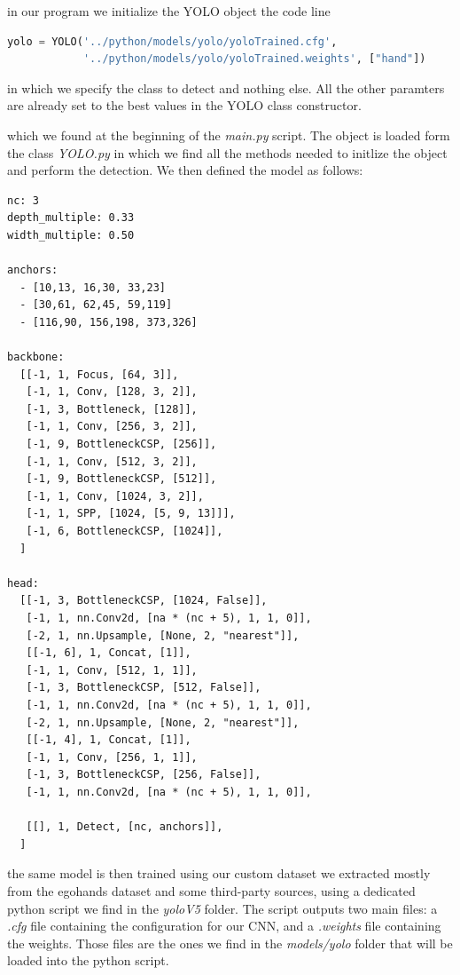 in our program we initialize the YOLO object the code line

\begin{lstlisting}[language=python]
    yolo = YOLO('../python/models/yolo/yoloTrained.cfg',
            '../python/models/yolo/yoloTrained.weights', ["hand"])
\end{lstlisting}
in which we specify the class to detect and nothing else. All the other
paramters are already set to the best values in the
YOLO class constructor.

which we found at the beginning of the \textit{main.py} script. The object is
loaded form the class \textit{YOLO.py}
in which we find all the methods needed to initlize the object and perform the
detection. We then defined the model as follows:

\begin{lstlisting}[]
nc: 3
depth_multiple: 0.33
width_multiple: 0.50

anchors:
  - [10,13, 16,30, 33,23] 
  - [30,61, 62,45, 59,119]
  - [116,90, 156,198, 373,326] 

backbone:
  [[-1, 1, Focus, [64, 3]],
   [-1, 1, Conv, [128, 3, 2]],
   [-1, 3, Bottleneck, [128]],
   [-1, 1, Conv, [256, 3, 2]],
   [-1, 9, BottleneckCSP, [256]],
   [-1, 1, Conv, [512, 3, 2]], 
   [-1, 9, BottleneckCSP, [512]],
   [-1, 1, Conv, [1024, 3, 2]],
   [-1, 1, SPP, [1024, [5, 9, 13]]],
   [-1, 6, BottleneckCSP, [1024]],
  ]

head:
  [[-1, 3, BottleneckCSP, [1024, False]],
   [-1, 1, nn.Conv2d, [na * (nc + 5), 1, 1, 0]],
   [-2, 1, nn.Upsample, [None, 2, "nearest"]],
   [[-1, 6], 1, Concat, [1]],
   [-1, 1, Conv, [512, 1, 1]],
   [-1, 3, BottleneckCSP, [512, False]],
   [-1, 1, nn.Conv2d, [na * (nc + 5), 1, 1, 0]],
   [-2, 1, nn.Upsample, [None, 2, "nearest"]],
   [[-1, 4], 1, Concat, [1]],
   [-1, 1, Conv, [256, 1, 1]],
   [-1, 3, BottleneckCSP, [256, False]],
   [-1, 1, nn.Conv2d, [na * (nc + 5), 1, 1, 0]],

   [[], 1, Detect, [nc, anchors]],
  ]
\end{lstlisting}

the same model is then trained using our custom dataset we extracted mostly
from the egohands dataset and some third-party sources, using a dedicated
python script we find in the \textit{yoloV5} folder.
The script outputs two main files: a \textit{.cfg} file containing the
configuration for our CNN, and a \textit{.weights} file containing the weights.
Those files are the ones we find in the \textit{models/yolo} folder
that will be loaded into the python script.

